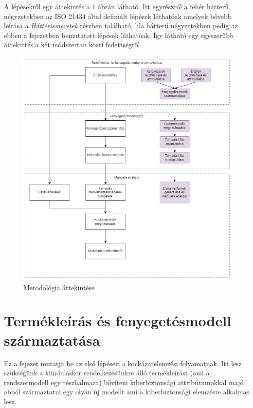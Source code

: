 A lépésekről egy áttekintés a \ref{fig:04_OVERVIEW} ábrán látható. Itt egyrészről a fehér hátterű négyzetekben az ISO 21434 által definiált lépések láthatóak amelyek bővebb leírása a \textit{Háttérismeretek} részben található, lila hátterű négyzetekben pedig az ebben a fejezetben bemutatott lépések láthatóak. Így látható egy egyszerűbb áttekintés a két módszertan közti fedettségről.

\begin{figure}[!ht]
	\centering
	\includegraphics[width=130mm, keepaspectratio]{figures/04_overview.png}
	\caption{Metodológia áttekintése}
	\label{fig:04_OVERVIEW}
\end{figure}

\section{Termékleírás és fenyegetésmodell származtatása}

Ez a fejezet mutatja be az első lépéseit a kockázatelemzési folyamatnak. Itt lesz szükségünk a kiinduláskor rendelkezésünkre álló termékleírást (ami a rendszermodell egy részhalmaza) bővíteni kiberbiztonsági attribútumokkal majd abból származtatni egy olyan új modellt ami a kiberbiztonsági elemzésre alkalmas lesz.

